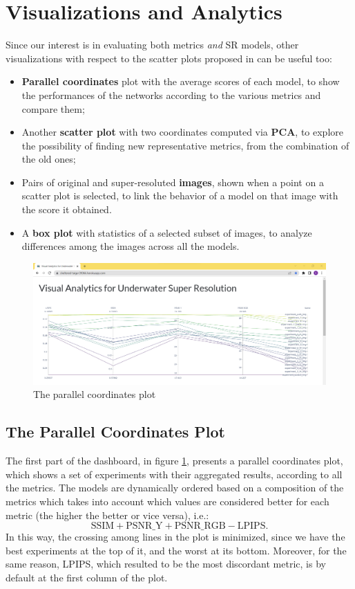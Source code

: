 \documentclass[12pt]{article}
\begin{document}
	\section{Visualizations and Analytics}\label{sec:vis}

	Since our interest is in evaluating both metrics \textit{and} SR models, other visualizations with respect to the scatter plots proposed in \cite{galasso2013unified} can be useful too:
	\begin{itemize}
		\item \textbf{Parallel coordinates} plot with the average scores of each model, to show the performances of the networks according to the various metrics and compare them;
		\item Another \textbf{scatter plot} with two coordinates computed via \textbf{PCA}, to explore the possibility of finding new representative metrics, from the combination of the old ones;
		\item Pairs of original and super-resoluted \textbf{images}, shown when a point on a scatter plot is selected, to link the behavior of a model on that image with the score it obtained.
		\item A \textbf{box plot} with statistics of a selected subset of images, to analyze differences among the images across all the models.
	\end{itemize}

	\begin{figure}[h!]
		\centering
		\includegraphics[width=0.7\linewidth]{imgs/parallel}
		\caption{The parallel coordinates plot}
		\label{fig:parallel}
	\end{figure}

	\subsection{The Parallel Coordinates Plot}\label{sec:parallel}

	The first part of the dashboard, in figure \ref{fig:parallel}, presents a parallel coordinates plot, which shows a set of experiments with their aggregated results, according to all the metrics. The models are dynamically ordered based on a composition of the metrics which takes into account which values are considered better for each metric (the higher the better or vice versa), i.e.:
	\begin{equation}
		\text{SSIM} + \text{PSNR\_Y} + \text{PSNR\_RGB} - \text{LPIPS}.
	\end{equation}
	In this way, the crossing among lines in the plot is minimized, since we have the best experiments at the top of it, and the worst at its bottom. Moreover, for the same reason, LPIPS, which resulted to be the most discordant metric, is by default at the first column of the plot.
\end{document}
